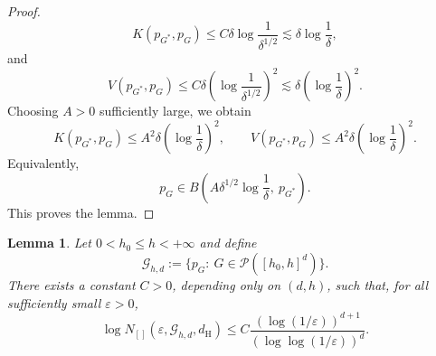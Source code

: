 \documentclass[twoside,12pt]{article}
\newtheorem{lem}[thm]{Lemma}
\begin{document}
\begin{proof}
\begin{displaymath}
K(p_{G^\ast},p_G)\le C\delta\log\frac{1}{\delta^{1/2}}\lesssim\delta\log\frac{1}{\delta},
\end{displaymath}
and
\begin{displaymath}
V(p_{G^\ast},p_G)\le C\delta\left(\log\frac{1}{\delta^{1/2}}\right)^2\lesssim\delta\left(\log\frac{1}{\delta}\right)^2.
\end{displaymath}
Choosing $A>0$ sufficiently large, we obtain
\begin{displaymath}
K(p_{G^\ast},p_G)\le A^2\delta\left(\log\frac{1}{\delta}\right)^2,\qquad V(p_{G^\ast},p_G)\le A^2\delta\left(\log\frac{1}{\delta}\right)^2.
\end{displaymath}
Equivalently,
\begin{displaymath}
p_G\in B\!\left(A\delta^{1/2}\log\frac{1}{\delta},\ p_{G^\ast}\right).
\end{displaymath}
This proves the lemma.
\end{proof}


\begin{lem}\label{lem:Poisson_bracketing_entropy_d}
Let $0<h_0\le h<+\infty$ and define \[ \mathcal G_{h,d}:= \{p_G:\ G\in\mathcal P([h_0,h]^d)\}. \] There exists a constant $C>0$, depending only on $(d,h)$, such that, for all sufficiently small $\varepsilon>0$,
\begin{displaymath}
\log N_{[]}(\varepsilon,\mathcal G_{h,d},d_{\mathrm H}) \le C\frac{(\log(1/\varepsilon))^{d+1}} {(\log\log(1/\varepsilon))^d}.
 \end{displaymath}
\end{lem}
\end{document}
